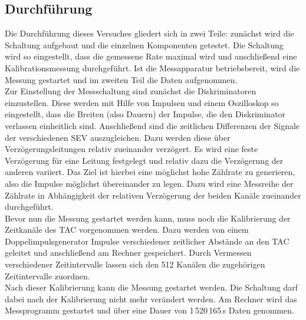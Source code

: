 \subsection{Durchführung}

Die Durchführung dieses Versuches gliedert sich in zwei Teile: zunächst wird die Schaltung aufgebaut und die einzelnen Komponenten getestet. Die Schaltung wird so eingestellt, dass die gemessene Rate maximal wird und anschließend eine Kalibrationsmessung durchgeführt. Ist die Messapparatur betriebsbereit, wird die Messung gestartet und im zweiten Teil die Daten aufgenommen. \\
Zur Einstellung der Messschaltung sind zunächst die Diskriminatoren einzustellen. Diese werden mit Hilfe von Impulsen und einem Oszilloskop so eingestellt, dass die Breiten (also Dauern) der Impulse, die den Diskriminator verlassen einheitlich sind. Anschließend sind die zeitlichen Differenzen der Signale der verschiedenen SEV auszugleichen. Dazu werden diese über Verzögerungsleitungen relativ zueinander verzögert. Es wird eine feste Verzögerung für eine Leitung festgelegt und relativ dazu die Verzögerung der anderen variiert. Das Ziel ist hierbei eine möglichst hohe Zählrate zu generieren, also die Impulse möglichst übereinander zu legen. Dazu wird eine Messreihe der Zählrate in Abhängigkeit der relativen Verzögerung der beiden Kanäle zueinander durchgeführt. \\
Bevor nun die Messung gestartet werden kann, muss noch die Kalibrierung der Zeitkanäle des TAC vorgenommen werden. Dazu werden von einem Doppelimpulsgenerator Impulse verschiedener zeitlicher Abstände an den TAC geleitet und anschließend am Rechner gespeichert. Durch Vermessen verschiedener Zeitintervalle lassen sich den 512 Kanälen die zugehörigen Zeitintervalle zuordnen. \\
Nach dieser Kalibrierung kann die Messung gestartet werden. Die Schaltung darf dabei nach der Kalibrierung nicht mehr verändert werden. Am Rechner wird das Messprogramm gestartet und über eine Dauer von 1\,520\,165\,s Daten genommen.
